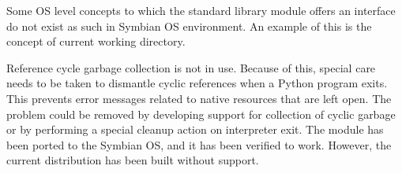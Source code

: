 Some OS level concepts to which the standard  library module 
offers an interface do not exist as such in Symbian OS environment. An 
example of this is the concept of current working directory.

Reference cycle garbage collection is not in use. Because of this, special 
care needs to be taken to dismantle cyclic references when a Python program 
exits. This prevents error messages related to native resources that are 
left open. The problem could be removed by developing support for collection 
of cyclic garbage or by performing a special cleanup action on interpreter 
exit. The  module has been ported to the Symbian OS, and 
it has been verified to work. However, the current distribution has been 
built without  support.
